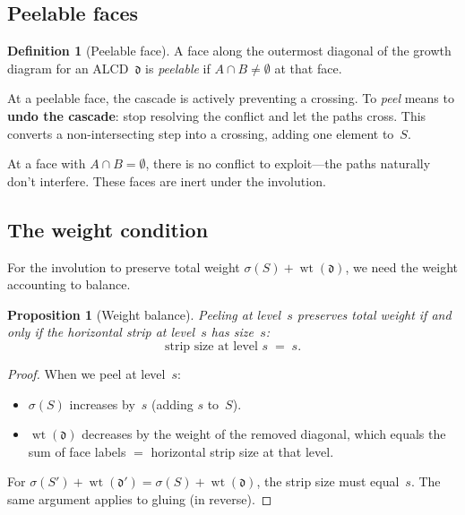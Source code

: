 \documentclass[11pt]{article}
\DeclareMathOperator{\wt}{wt}
\theoremstyle{plain}
\newtheorem{proposition}[theorem]{Proposition}
\theoremstyle{definition}
\newtheorem{definition}[theorem]{Definition}
\begin{document}
\subsection{Peelable faces}

\begin{definition}[Peelable face]
\label{def:peelable}
A face along the outermost diagonal of the growth diagram
for an ALCD~$\mathfrak{d}$ is \emph{peelable} if
$A \cap B \neq \emptyset$ at that face.
\end{definition}

At a peelable face, the cascade is actively preventing
a crossing.  To \emph{peel} means to \textbf{undo the
cascade}: stop resolving the conflict and let the paths
cross.  This converts a non-intersecting step into a
crossing, adding one element to~$S$.

At a face with $A \cap B = \emptyset$, there is no
conflict to exploit---the paths naturally don't
interfere.  These faces are inert under the involution.


\subsection{The weight condition}

For the involution to preserve total weight
$\sigma(S) + \wt(\mathfrak{d})$, we need the weight
accounting to balance.

\begin{proposition}[Weight balance]
\label{prop:weight}
Peeling at level~$s$ preserves total weight if and only if
the horizontal strip at level~$s$ has size~$s$:
\begin{equation}\label{eq:weight-condition}
  \boxed{\;
  \text{strip size at level } s \;=\; s.
  \;}
\end{equation}
\end{proposition}

\begin{proof}
When we peel at level~$s$:
\begin{itemize}
  \item $\sigma(S)$ increases by~$s$ (adding $s$ to~$S$).
  \item $\wt(\mathfrak{d})$ decreases by the weight
    of the removed diagonal, which equals the sum of
    face labels $= $ horizontal strip size at that level.
\end{itemize}
For $\sigma(S') + \wt(\mathfrak{d}')
= \sigma(S) + \wt(\mathfrak{d})$, the strip size must
equal~$s$.  The same argument applies to gluing (in
reverse).
\end{proof}
\end{document}
